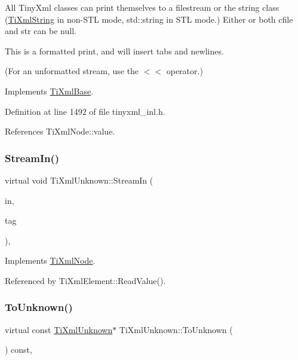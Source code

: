 All Tiny\+Xml classes can print themselves to a filestream or the string class (\hyperlink{class_ti_xml_string}{Ti\+Xml\+String} in non-\/\+S\+TL mode, std\+::string in S\+TL mode.) Either or both cfile and str can be null.

This is a formatted print, and will insert tabs and newlines.

(For an unformatted stream, use the $<$$<$ operator.) 

Implements \hyperlink{class_ti_xml_base_a0de56b3f2ef14c65091a3b916437b512}{Ti\+Xml\+Base}.



Definition at line 1492 of file tinyxml\+\_\+inl.\+h.



References Ti\+Xml\+Node\+::value.

\hypertarget{class_ti_xml_unknown_ad3f8fcc1efe364ddd8f43ef9a1046300}{}\label{class_ti_xml_unknown_ad3f8fcc1efe364ddd8f43ef9a1046300} 
\subsubsection{\texorpdfstring{Stream\+In()}{StreamIn()}}
{\footnotesize\ttfamily virtual void Ti\+Xml\+Unknown\+::\+Stream\+In (\begin{DoxyParamCaption}\item[{std\+::istream $\ast$}]{in,  }\item[{\hyperlink{tinyxml_8h_a92bada05fd84d9a0c9a5bbe53de26887}{T\+I\+X\+M\+L\+\_\+\+S\+T\+R\+I\+NG} $\ast$}]{tag }\end{DoxyParamCaption})\hspace{0.3cm}{\ttfamily [protected]}, {\ttfamily [virtual]}}



Implements \hyperlink{class_ti_xml_node_ab4b4af1a6b486dcbc0e327cf291270af}{Ti\+Xml\+Node}.



Referenced by Ti\+Xml\+Element\+::\+Read\+Value().

\hypertarget{class_ti_xml_unknown_a0d08dc16fc9ce16140ccaefbc35f6ea6}{}\label{class_ti_xml_unknown_a0d08dc16fc9ce16140ccaefbc35f6ea6} 
\subsubsection{\texorpdfstring{To\+Unknown()}{ToUnknown()}\hspace{0.1cm}{\footnotesize\ttfamily [1/2]}}
{\footnotesize\ttfamily virtual const \hyperlink{class_ti_xml_unknown}{Ti\+Xml\+Unknown}$\ast$ Ti\+Xml\+Unknown\+::\+To\+Unknown (\begin{DoxyParamCaption}{ }\end{DoxyParamCaption}) const\hspace{0.3cm}{\ttfamily [inline]}, {\ttfamily [virtual]}}



